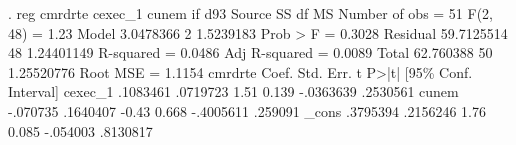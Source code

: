 . reg cmrdrte cexec_1 cunem if d93
{\smallskip}
      Source {\VBAR}       SS           df       MS      Number of obs   =        51
   F(2, 48)        =      1.23
       Model {\VBAR}   3.0478366         2   1.5239183   Prob > F        =    0.3028
    Residual {\VBAR}  59.7125514        48  1.24401149   R-squared       =    0.0486
   Adj R-squared   =    0.0089
       Total {\VBAR}   62.760388        50  1.25520776   Root MSE        =    1.1154
{\smallskip}
     cmrdrte {\VBAR}      Coef.   Std. Err.      t    P>|t|     [95\% Conf. Interval]
     cexec_1 {\VBAR}   .1083461   .0719723     1.51   0.139    -.0363639    .2530561
       cunem {\VBAR}   -.070735   .1640407    -0.43   0.668    -.4005611     .259091
       _cons {\VBAR}   .3795394   .2156246     1.76   0.085     -.054003    .8130817
{\smallskip}
